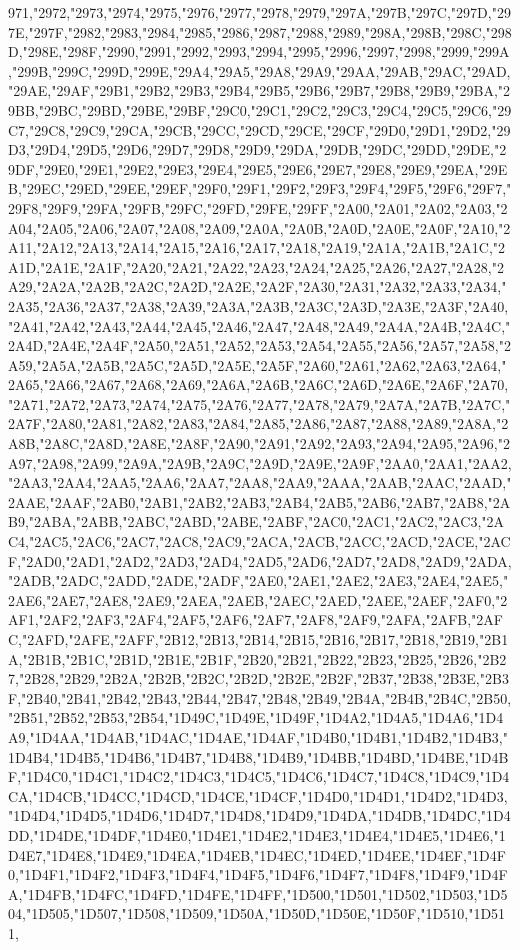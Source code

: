 971,"2972,"2973,"2974,"2975,"2976,"2977,"2978,"2979,"297A,"297B,"297C,"297D,"297E,"297F,"2982,"2983,"2984,"2985,"2986,"2987,"2988,"2989,"298A,"298B,"298C,"298D,"298E,"298F,"2990,"2991,"2992,"2993,"2994,"2995,"2996,"2997,"2998,"2999,"299A,"299B,"299C,"299D,"299E,"29A4,"29A5,"29A8,"29A9,"29AA,"29AB,"29AC,"29AD,"29AE,"29AF,"29B1,"29B2,"29B3,"29B4,"29B5,"29B6,"29B7,"29B8,"29B9,"29BA,"29BB,"29BC,"29BD,"29BE,"29BF,"29C0,"29C1,"29C2,"29C3,"29C4,"29C5,"29C6,"29C7,"29C8,"29C9,"29CA,"29CB,"29CC,"29CD,"29CE,"29CF,"29D0,"29D1,"29D2,"29D3,"29D4,"29D5,"29D6,"29D7,"29D8,"29D9,"29DA,"29DB,"29DC,"29DD,"29DE,"29DF,"29E0,"29E1,"29E2,"29E3,"29E4,"29E5,"29E6,"29E7,"29E8,"29E9,"29EA,"29EB,"29EC,"29ED,"29EE,"29EF,"29F0,"29F1,"29F2,"29F3,"29F4,"29F5,"29F6,"29F7,"29F8,"29F9,"29FA,"29FB,"29FC,"29FD,"29FE,"29FF,"2A00,"2A01,"2A02,"2A03,"2A04,"2A05,"2A06,"2A07,"2A08,"2A09,"2A0A,"2A0B,"2A0D,"2A0E,"2A0F,"2A10,"2A11,"2A12,"2A13,"2A14,"2A15,"2A16,"2A17,"2A18,"2A19,"2A1A,"2A1B,"2A1C,"2A1D,"2A1E,"2A1F,"2A20,"2A21,"2A22,"2A23,"2A24,"2A25,"2A26,"2A27,"2A28,"2A29,"2A2A,"2A2B,"2A2C,"2A2D,"2A2E,"2A2F,"2A30,"2A31,"2A32,"2A33,"2A34,"2A35,"2A36,"2A37,"2A38,"2A39,"2A3A,"2A3B,"2A3C,"2A3D,"2A3E,"2A3F,"2A40,"2A41,"2A42,"2A43,"2A44,"2A45,"2A46,"2A47,"2A48,"2A49,"2A4A,"2A4B,"2A4C,"2A4D,"2A4E,"2A4F,"2A50,"2A51,"2A52,"2A53,"2A54,"2A55,"2A56,"2A57,"2A58,"2A59,"2A5A,"2A5B,"2A5C,"2A5D,"2A5E,"2A5F,"2A60,"2A61,"2A62,"2A63,"2A64,"2A65,"2A66,"2A67,"2A68,"2A69,"2A6A,"2A6B,"2A6C,"2A6D,"2A6E,"2A6F,"2A70,"2A71,"2A72,"2A73,"2A74,"2A75,"2A76,"2A77,"2A78,"2A79,"2A7A,"2A7B,"2A7C,"2A7F,"2A80,"2A81,"2A82,"2A83,"2A84,"2A85,"2A86,"2A87,"2A88,"2A89,"2A8A,"2A8B,"2A8C,"2A8D,"2A8E,"2A8F,"2A90,"2A91,"2A92,"2A93,"2A94,"2A95,"2A96,"2A97,"2A98,"2A99,"2A9A,"2A9B,"2A9C,"2A9D,"2A9E,"2A9F,"2AA0,"2AA1,"2AA2,"2AA3,"2AA4,"2AA5,"2AA6,"2AA7,"2AA8,"2AA9,"2AAA,"2AAB,"2AAC,"2AAD,"2AAE,"2AAF,"2AB0,"2AB1,"2AB2,"2AB3,"2AB4,"2AB5,"2AB6,"2AB7,"2AB8,"2AB9,"2ABA,"2ABB,"2ABC,"2ABD,"2ABE,"2ABF,"2AC0,"2AC1,"2AC2,"2AC3,"2AC4,"2AC5,"2AC6,"2AC7,"2AC8,"2AC9,"2ACA,"2ACB,"2ACC,"2ACD,"2ACE,"2ACF,"2AD0,"2AD1,"2AD2,"2AD3,"2AD4,"2AD5,"2AD6,"2AD7,"2AD8,"2AD9,"2ADA,"2ADB,"2ADC,"2ADD,"2ADE,"2ADF,"2AE0,"2AE1,"2AE2,"2AE3,"2AE4,"2AE5,"2AE6,"2AE7,"2AE8,"2AE9,"2AEA,"2AEB,"2AEC,"2AED,"2AEE,"2AEF,"2AF0,"2AF1,"2AF2,"2AF3,"2AF4,"2AF5,"2AF6,"2AF7,"2AF8,"2AF9,"2AFA,"2AFB,"2AFC,"2AFD,"2AFE,"2AFF,"2B12,"2B13,"2B14,"2B15,"2B16,"2B17,"2B18,"2B19,"2B1A,"2B1B,"2B1C,"2B1D,"2B1E,"2B1F,"2B20,"2B21,"2B22,"2B23,"2B25,"2B26,"2B27,"2B28,"2B29,"2B2A,"2B2B,"2B2C,"2B2D,"2B2E,"2B2F,"2B37,"2B38,"2B3E,"2B3F,"2B40,"2B41,"2B42,"2B43,"2B44,"2B47,"2B48,"2B49,"2B4A,"2B4B,"2B4C,"2B50,"2B51,"2B52,"2B53,"2B54,"1D49C,"1D49E,"1D49F,"1D4A2,"1D4A5,"1D4A6,"1D4A9,"1D4AA,"1D4AB,"1D4AC,"1D4AE,"1D4AF,"1D4B0,"1D4B1,"1D4B2,"1D4B3,"1D4B4,"1D4B5,"1D4B6,"1D4B7,"1D4B8,"1D4B9,"1D4BB,"1D4BD,"1D4BE,"1D4BF,"1D4C0,"1D4C1,"1D4C2,"1D4C3,"1D4C5,"1D4C6,"1D4C7,"1D4C8,"1D4C9,"1D4CA,"1D4CB,"1D4CC,"1D4CD,"1D4CE,"1D4CF,"1D4D0,"1D4D1,"1D4D2,"1D4D3,"1D4D4,"1D4D5,"1D4D6,"1D4D7,"1D4D8,"1D4D9,"1D4DA,"1D4DB,"1D4DC,"1D4DD,"1D4DE,"1D4DF,"1D4E0,"1D4E1,"1D4E2,"1D4E3,"1D4E4,"1D4E5,"1D4E6,"1D4E7,"1D4E8,"1D4E9,"1D4EA,"1D4EB,"1D4EC,"1D4ED,"1D4EE,"1D4EF,"1D4F0,"1D4F1,"1D4F2,"1D4F3,"1D4F4,"1D4F5,"1D4F6,"1D4F7,"1D4F8,"1D4F9,"1D4FA,"1D4FB,"1D4FC,"1D4FD,"1D4FE,"1D4FF,"1D500,"1D501,"1D502,"1D503,"1D504,"1D505,"1D507,"1D508,"1D509,"1D50A,"1D50D,"1D50E,"1D50F,"1D510,"1D511,